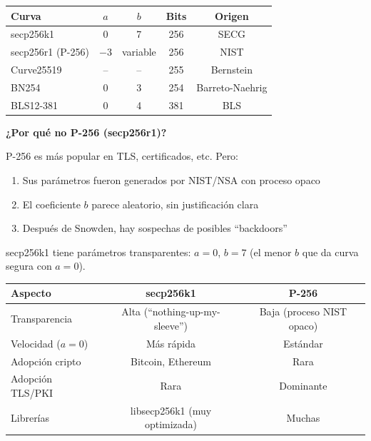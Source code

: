 \documentclass[11pt,a4paper,twoside,openright]{book}
\theoremstyle{definition}
\theoremstyle{plain}
\theoremstyle{remark}
\begin{document}
\begin{center}
\begin{tabular}{lcccc}
\toprule
\textbf{Curva} & \textbf{$a$} & \textbf{$b$} & \textbf{Bits} & \textbf{Origen} \\
\midrule
secp256k1 & 0 & 7 & 256 & SECG \\
secp256r1 (P-256) & $-3$ & variable & 256 & NIST \\
Curve25519 & -- & -- & 255 & Bernstein \\
BN254 & 0 & 3 & 254 & Barreto-Naehrig \\
BLS12-381 & 0 & 4 & 381 & BLS \\
\bottomrule
\end{tabular}
\end{center}

\begin{keyidea}
\textbf{¿Por qué no P-256 (secp256r1)?}

P-256 es más popular en TLS, certificados, etc. Pero:
\begin{enumerate}
    \item Sus parámetros fueron generados por NIST/NSA con proceso opaco
    \item El coeficiente $b$ parece aleatorio, sin justificación clara
    \item Después de Snowden, hay sospechas de posibles ``backdoors''
\end{enumerate}

secp256k1 tiene parámetros transparentes: $a = 0$, $b = 7$ (el menor $b$ que da curva segura con $a = 0$).
\end{keyidea}

\begin{center}
\begin{tabular}{lcc}
\toprule
\textbf{Aspecto} & \textbf{secp256k1} & \textbf{P-256} \\
\midrule
Transparencia & Alta (``nothing-up-my-sleeve'') & Baja (proceso NIST opaco) \\
Velocidad ($a = 0$) & Más rápida & Estándar \\
Adopción cripto & Bitcoin, Ethereum & Rara \\
Adopción TLS/PKI & Rara & Dominante \\
Librerías & libsecp256k1 (muy optimizada) & Muchas \\
\bottomrule
\end{tabular}
\end{center}

\end{document}
